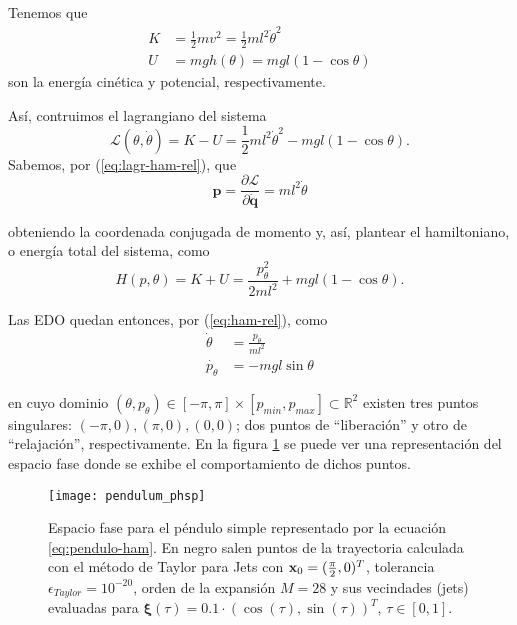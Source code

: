 Tenemos que 
\begin{align}
 K &= \frac{1}{2}m v^2 = \frac{1}{2} m l^2 \dot{\theta}^2 \nonumber \\
 U &= mgh(\theta) = mgl\left(1 - \cos{\theta} \right)
\end{align}
son la energía cinética y potencial, respectivamente. 

Así, contruimos el lagrangiano del sistema
\begin{equation*}
 \mathcal{L}(\theta,\dot{\theta}) = K - U = \frac{1}{2} m l^2 \dot{\theta}^2 - mgl\left(1 - \cos{\theta} \right).
\end{equation*}
Sabemos, por (\ref{eq:lagr-ham-rel}), que
\begin{equation*}
 \mathbf{p} = \frac{\partial \mathcal{L}}{\partial \mathbf{\dot{q}}} = ml^2\dot{\theta}
\end{equation*}

obteniendo la coordenada conjugada de momento y, así, plantear el hamiltoniano, o energía total del sistema, como
\begin{equation}
 H(p,\theta) = K + U = \frac{p_{\theta}^2}{2ml^2} + mgl\left(1 - \cos{\theta} \right).
\label{eq:pendulo-ham}
\end{equation}
 
Las EDO quedan entonces, por (\ref{eq:ham-rel}), como
\begin{align}
 \dot{\theta} &= \frac{p_{\theta}}{ml^2} \nonumber \\
 \dot{p_{\theta}} &= -mgl\sin{\theta} 
\label{eq:pendulo-ode}
\end{align}

en cuyo dominio $(\theta,p_{\theta}) \in [-\pi,\pi]\times[p_{min},p_{max}] \subset \mathbb{R}^2$ existen tres puntos singulares: $(-\pi,0),(\pi,0), (0,0)$; dos puntos de ``liberación'' y otro de ``relajación'', respectivamente. En la figura \ref{fig:pendulum_pshp} se puede ver una representación del espacio fase donde se exhibe el comportamiento de dichos puntos.

\begin{figure}[h!]
 \centering
 \texttt{[image: pendulum\_phsp]}
 \caption{Espacio fase para el péndulo simple representado por la ecuación \ref{eq:pendulo-ham}. En negro salen puntos de la trayectoria calculada con el método de Taylor para Jets con $\mathbf{x}_0 = (\frac{\pi}{2},0)^T$, tolerancia $\epsilon_{Taylor} = 10^{-20}$, orden de la expansión $M = 28$ y sus vecindades (jets) evaluadas para $\mathbf{\xi}(\tau) = 0.1\cdot \left( \cos(\tau), \sin(\tau) \right)^T$, $\tau \in [0,1]$.}
\label{fig:pendulum_pshp}
\end{figure}


